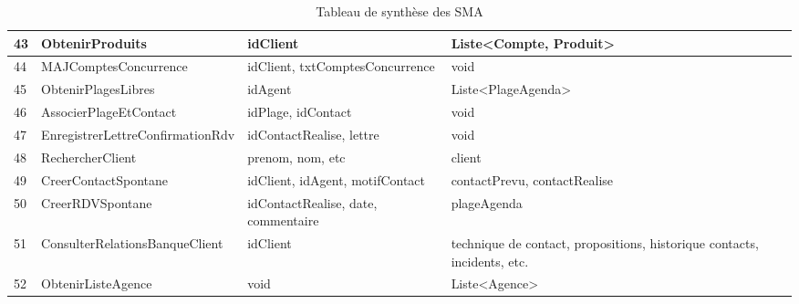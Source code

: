 \begin{table}[H]
{\begin{tabular}{p{1cm}|p{5cm}p{6cm}p{6cm}}
            43 & ObtenirProduits                    & idClient                                                      & Liste<Compte, Produit>\\ \hline
            44 & MAJComptesConcurrence              & idClient, txtComptesConcurrence                               & void \\ \hline
            45 & ObtenirPlagesLibres                & idAgent                                                       & Liste<PlageAgenda>\\ \hline
            46 & AssocierPlageEtContact             & idPlage, idContact                                            & void\\ \hline
            47 & EnregistrerLettreConfirmationRdv   & idContactRealise, lettre                                      & void\\ \hline
            48 & RechercherClient                   & prenom, nom, etc                                              & client\\ \hline
            49 & CreerContactSpontane               & idClient, idAgent, motifContact                               & contactPrevu, contactRealise\\ \hline
            50 & CreerRDVSpontane                   & idContactRealise, date, commentaire                           & plageAgenda \\ \hline 
            51 & ConsulterRelationsBanqueClient & idClient & technique de contact, propositions, historique contacts, incidents, etc. \\ \hline
            52 & ObtenirListeAgence & void & Liste<Agence> \\
        \end{tabular}
        }
        \caption{Tableau de synthèse des SMA}
\end{table}


